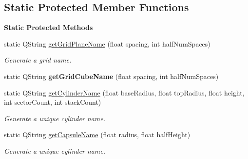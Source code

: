 \subsection*{Static Protected Member Functions}
\begin{Indent}\textbf{ Static Protected Methods}\par
\begin{DoxyCompactItemize}
\item 
\mbox{\label{classrev_1_1_polygon_cache_afd36fc6e3aa9ec1381755c247bec8228}} 
static Q\+String \mbox{\hyperlink{classrev_1_1_polygon_cache_afd36fc6e3aa9ec1381755c247bec8228}{get\+Grid\+Plane\+Name}} (float spacing, int half\+Num\+Spaces)
\begin{DoxyCompactList}\small\item\em Generate a grid name. \end{DoxyCompactList}\item 
\mbox{\label{classrev_1_1_polygon_cache_af866689e9f93082394d380845a03aba7}} 
static Q\+String {\bfseries get\+Grid\+Cube\+Name} (float spacing, int half\+Num\+Spaces)
\item 
\mbox{\label{classrev_1_1_polygon_cache_a5fa50b5cec26ec818c4b90617c48aa64}} 
static Q\+String \mbox{\hyperlink{classrev_1_1_polygon_cache_a5fa50b5cec26ec818c4b90617c48aa64}{get\+Cylinder\+Name}} (float base\+Radius, float top\+Radius, float height, int sector\+Count, int stack\+Count)
\begin{DoxyCompactList}\small\item\em Generate a unique cylinder name. \end{DoxyCompactList}\item 
\mbox{\label{classrev_1_1_polygon_cache_a9aa533bcca9cc240523c934fe70eccab}} 
static Q\+String \mbox{\hyperlink{classrev_1_1_polygon_cache_a9aa533bcca9cc240523c934fe70eccab}{get\+Capsule\+Name}} (float radius, float half\+Height)
\begin{DoxyCompactList}\small\item\em Generate a unique cylinder name. \end{DoxyCompactList}\item 
\mbox{\label{classrev_1_1_polygon_cache_af042c49e58f5e123cfcb76f098be3534}} 

\end{DoxyCompactItemize}
\end{Indent}
